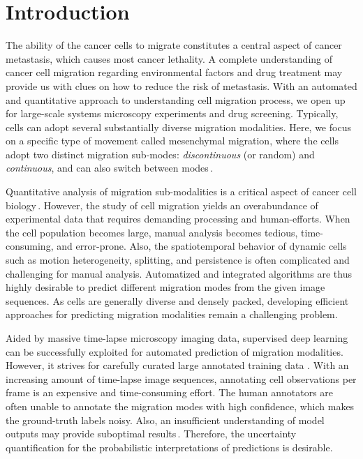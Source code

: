 \documentclass{article}
\begin{document}
\section{Introduction}
\label{sec:intro}

The ability of the cancer cells to migrate constitutes a central aspect of cancer metastasis,
which causes most cancer lethality. 
A complete understanding of cancer cell migration regarding environmental factors and drug 
treatment may provide us with clues on how to reduce the risk of metastasis.
With an automated and quantitative approach to understanding cell migration process, we 
open up for large-scale systems microscopy experiments and drug screening. 
Typically, cells can adopt several substantially diverse migration modalities. 
Here, we focus on a specific type of movement called mesenchymal migration, where the cells 
adopt two distinct migration sub-modes: \textit{discontinuous} (or random) and \textit{
continuous}, and can also switch between modes\,\cite{shafqat2016analysis}.

Quantitative analysis of migration sub-modalities is a critical aspect of cancer cell biology\,\cite{masuzzo2016taking}. 
However, the study of cell migration yields an overabundance of experimental data that requires
demanding processing and human-efforts.
When the cell population becomes large, manual analysis becomes tedious, time-consuming, and error-prone. 
Also, the spatiotemporal behavior of dynamic cells such as motion heterogeneity, splitting, and
persistence is often complicated and challenging for manual analysis.  
Automatized and integrated algorithms are thus highly desirable to predict different
migration modes from the given image sequences. As cells are generally diverse and 
densely packed, developing efficient approaches for predicting migration modalities 
remain a challenging problem.

Aided by massive time-lapse microscopy imaging data, supervised deep learning can be successfully
exploited for automated prediction of migration modalities. However, it strives for carefully curated 
large annotated training data \cite{gupta2019deep}.
With an increasing amount of time-lapse image sequences, annotating cell observations per frame is an 
expensive and time-consuming effort. The human annotators are often unable to annotate the migration 
modes with high confidence, which makes the ground-truth labels noisy. Also, an insufficient 
understanding of model outputs may provide suboptimal results\,\cite{leibig2017leveraging, zhou2017brief}.
Therefore, the uncertainty quantification for the probabilistic interpretations of predictions is desirable. 
\end{document}
